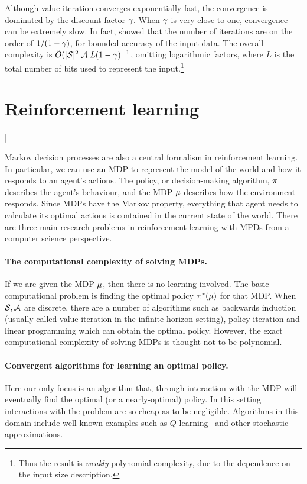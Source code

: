 Although value iteration converges exponentially fast, the convergence
is dominated by the discount factor $\gamma$. When $\gamma$ is very
close to one, convergence can be extremely slow.  In fact,
\citet{tseng1990solving} showed that the number of iterations are on
the order of $1 / (1 - \gamma)$, for bounded accuracy of the input
data. The overall complexity is
$\tilde{O}(|{\mathcal{S}}|^2 |{\mathcal{A}}| L (1 - \gamma)^{-1}$, omitting logarithmic
factors, where $L$ is the total number of bits used to represent the
input.\footnote{Thus the result is \emph{weakly} polynomial complexity, due to the dependence on the input size description.}

\section{Reinforcement learning}
\label{sec:reinf-learn}
|

Markov decision processes are also a central formalism in reinforcement learning. In particular, we can use an MDP to represent the model of the world and how it responds to an agent's actions. The policy, or decision-making algorithm, $\pi$ describes the agent's behaviour, and the MDP $\mu$ describes how the environment responds. Since MDPs have the Markov property, everything that agent needs to calculate its optimal actions is contained in the current state of the world. There are three main research problems in reinforcement learning with MPDs from a computer science perspective.

\paragraph{The computational complexity of solving MDPs.}
If we are given the MDP $\mu$, then there is no learning involved. The basic computational problem is finding the optimal policy $\pi^*(\mu)$ for that MDP. When ${\mathcal{S}}, {\mathcal{A}}$ are discrete, there are a number of algorithms such as backwards induction (usually called value iteration in the infinite horizon setting), policy iteration and linear programming which can obtain the optimal policy. However, the exact computational complexity of solving MDPs is thought not to be polynomial.

\paragraph{Convergent algorithms for learning an optimal policy.}
Here our only focus is an algorithm that, through interaction with the MDP will eventually find the optimal (or a nearly-optimal) policy. In this setting interactions with the problem are so cheap as to be negligible. Algorithms in this domain include well-known examples such as $Q$-learning~\cite{mach:Watkins+Dayan:1992} and other stochastic approximations.

